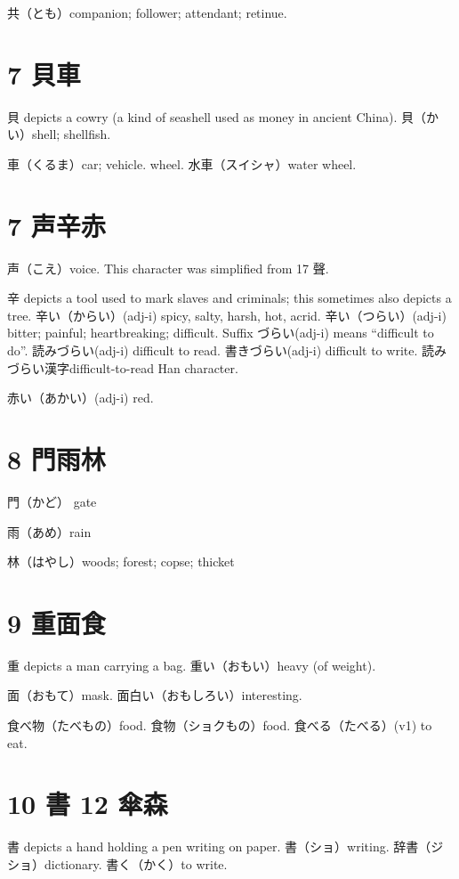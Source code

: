 共（とも）companion; follower; attendant; retinue.

\section{7 貝車}

貝 depicts a cowry (a kind of seashell used as money in ancient China).
貝（かい）shell; shellfish.

車（くるま）car; vehicle. wheel.
水車（スイシャ）water wheel.

\section{7 声辛赤}

声（こえ）voice.
This character was simplified from 17 聲.

辛 depicts a tool used to mark slaves and criminals;
this sometimes also depicts a tree.
辛い（からい）(adj-i) spicy, salty, harsh, hot, acrid.
辛い（つらい）(adj-i) bitter; painful; heartbreaking; difficult.
Suffix づらい(adj-i) means ``difficult to do''.
読みづらい(adj-i) difficult to read.
書きづらい(adj-i) difficult to write.
読みづらい漢字difficult-to-read Han character.

赤い（あかい）(adj-i) red.

\section{8 門雨林}

門（かど） gate

雨（あめ）rain

林（はやし）woods; forest; copse; thicket

\section{9 重面食}

重 depicts a man carrying a bag.
重い（おもい）heavy (of weight).

面（おもて）mask.
面白い（おもしろい）interesting.

食べ物（たべもの）food.
食物（ショクもの）food.
食べる（たべる）(v1) to eat.

\section{10 書 12 傘森}

書 depicts a hand holding a pen writing on paper.
書（ショ）writing.
辞書（ジショ）dictionary.
書く（かく）to write.

